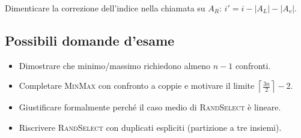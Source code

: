 \begin{hardnote}
Dimenticare la correzione dell'indice nella chiamata su $A_R$:
$i' = i-|A_L|-|A_v|$.
\end{hardnote}

\subsection{Possibili domande d'esame}
\begin{itemize}
	\item Dimostrare che minimo/massimo richiedono almeno $n-1$ confronti.
	\item Completare \textsc{MinMax} con confronto a coppie e motivare il limite
	$\left\lceil\frac{3n}{2}\right\rceil-2$.
	\item Giustificare formalmente perché il caso medio di \textsc{RandSelect} è lineare.
	\item Riscrivere \textsc{RandSelect} con duplicati espliciti (partizione a tre insiemi).
\end{itemize}

